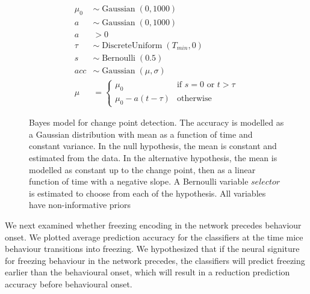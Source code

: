 \begin{figure}[h]
    \centering
    \begin{minipage}[b]{0.45\linewidth}
        
    \end{minipage}
    \begin{minipage}[b]{0.45\linewidth}
        \begin{align*}
            \mu_0 &\sim \operatorname{Gaussian}(0, 1000) \\
            a &\sim \operatorname{Gaussian}(0, 1000) \\
            a &> 0 \\
            \tau &\sim \operatorname{DiscreteUniform}(T_{min}, 0) \\
            s &\sim \operatorname{Bernoulli}(0.5) \\
            acc &\sim \operatorname{Gaussian}(\mu, \sigma) \\
            \mu &=
                \begin{cases}
                    \mu_0 & \text{if }s=0\text{ or }t>\tau \\
                    \mu_0 - a(t-\tau) & \text{otherwise}
                \end{cases}
        \end{align*}
    \end{minipage}
    \caption{Bayes model for change point detection. The accuracy is modelled as a Gaussian distribution with mean as a function of time and constant variance. In the null hypothesis, the mean is constant and estimated from the data. In the alternative hypothesis, the mean is modelled as constant up to the change point, then as a linear function of time with a negative slope. A Bernoulli variable $selector$ is estimated to choose from each of the hypothesis. All variables have non-informative priors \label{f.ad.bayesmodel}}
\end{figure}

We next examined whether freezing encoding in the network precedes behaviour onset.  We plotted average prediction accuracy for the classifiers at the time mice behaviour transitions into freezing. We hypothesized that if the neural signiture for freezing behaviour in the network precedes, the classifiers will predict freezing earlier than the behavioural onset, which will result in a reduction prediction accuracy before behavioural onset.

